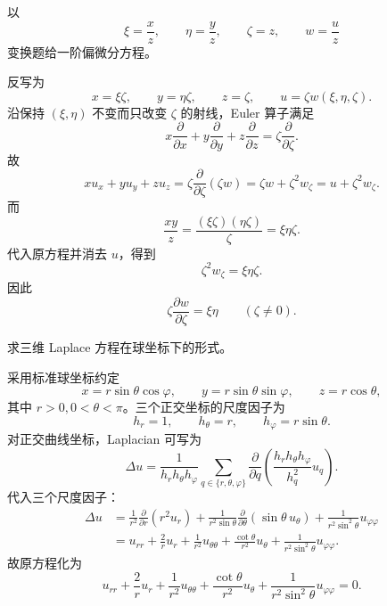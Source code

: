 \begin{xexercise}[20.3.3 练习题 6]
以
\[
  \xi=\frac xz,\qquad \eta=\frac yz,
  \qquad \zeta=z,
  \qquad w=\frac uz
\]
变换题给一阶偏微分方程。
\end{xexercise}
\begin{xsolution}
反写为
\[
  x=\xi\zeta,
  \qquad y=\eta\zeta,
  \qquad z=\zeta,
  \qquad u=\zeta w(\xi,\eta,\zeta).
\]
沿保持 $(\xi,\eta)$ 不变而只改变 $\zeta$ 的射线，Euler 算子满足
\[
  x\frac\partial{\partial x}
  +y\frac\partial{\partial y}
  +z\frac\partial{\partial z}
  =\zeta\frac\partial{\partial\zeta}.
\]
故
\[
  xu_x+yu_y+zu_z
  =\zeta\frac\partial{\partial\zeta}(\zeta w)
  =\zeta w+\zeta^2w_\zeta
  =u+\zeta^2w_\zeta.
\]
而
\[
  \frac{xy}{z}=\frac{(\xi\zeta)(\eta\zeta)}\zeta
  =\xi\eta\zeta.
\]
代入原方程并消去 $u$，得到
\[
  \zeta^2w_\zeta=\xi\eta\zeta.
\]
因此
\[
  \boxed{\displaystyle
    \zeta\frac{\partial w}{\partial\zeta}=\xi\eta}
  \qquad(\zeta\ne0).
\]
\end{xsolution}

\begin{xexercise}[20.3.3 练习题 7]
求三维 Laplace 方程在球坐标下的形式。
\end{xexercise}
\begin{xsolution}
采用标准球坐标约定
\[
  x=r\sin\theta\cos\varphi,
  \qquad
  y=r\sin\theta\sin\varphi,
  \qquad
  z=r\cos\theta,
\]
其中 $r>0,0<\theta<\pi$。三个正交坐标的尺度因子为
\[
  h_r=1,
  \qquad h_\theta=r,
  \qquad h_\varphi=r\sin\theta.
\]
对正交曲线坐标，Laplacian 可写为
\[
  \Delta u
  =\frac1{h_rh_\theta h_\varphi}
   \sum_{q\in\{r,\theta,\varphi\}}
   \frac\partial{\partial q}
   \left(\frac{h_rh_\theta h_\varphi}{h_q^2}u_q\right).
\]
代入三个尺度因子：
\begin{align*}
  \Delta u
  &=\frac{1}{r^2}\frac\partial{\partial r}
      \left(r^2u_r\right)
    +\frac{1}{r^2\sin\theta}\frac\partial{\partial\theta}
      \left(\sin\theta\,u_\theta\right)
    +\frac{1}{r^2\sin^2\theta}u_{\varphi\varphi}\\
  &=u_{rr}+\frac2r u_r
    +\frac1{r^2}u_{\theta\theta}
    +\frac{\cot\theta}{r^2}u_\theta
    +\frac1{r^2\sin^2\theta}u_{\varphi\varphi}.
\end{align*}
故原方程化为
\[
  \boxed{\displaystyle
    u_{rr}+\frac2r u_r
    +\frac1{r^2}u_{\theta\theta}
    +\frac{\cot\theta}{r^2}u_\theta
    +\frac1{r^2\sin^2\theta}u_{\varphi\varphi}=0}.
\]
\end{xsolution}

